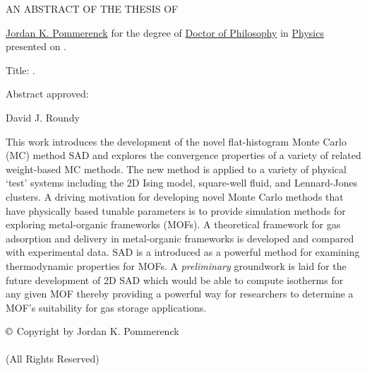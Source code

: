 \thispagestyle{empty}
\begin{center}
	\large
	AN ABSTRACT OF THE THESIS OF
\end{center}


\justify{}
\underline{Jordan K. Pommerenck} for the degree of \underline{Doctor of Philosophy} in \underline{Physics}
presented on \underline{}.
\vspace{1.0cm}

\justify{}
Title: \underline{}.
\vspace{2.0cm}

\justify{}
Abstract approved:
\underline{\hspace{11cm}}
\vspace{0.5cm}

\hspace{7.0cm} David J. Roundy
\vspace{1.0cm}

\justify{}
\doublespacing
This work introduces the development of the novel flat-histogram Monte 
Carlo (MC) method SAD and explores the convergence properties of a 
variety of related weight-based MC methods. The new method is applied 
to a variety of physical `test' systems including the 2D Ising model, 
square-well fluid, and Lennard-Jones clusters. A driving motivation for 
developing novel Monte Carlo methods that have physically based tunable 
parameters is to provide simulation methods for exploring metal-organic 
frameworks (MOFs). A theoretical framework for gas adsorption and 
delivery in metal-organic frameworks is developed and compared with 
experimental data. SAD is a introduced as a powerful method for 
examining thermodynamic properties for MOFs.  A \emph{preliminary} 
groundwork is laid for the future development of 2D SAD which would be 
able to compute isotherms for any given MOF thereby providing a 
powerful way for researchers to determine a MOF's suitability for gas 
storage applications.


\newpage{}
\thispagestyle{empty}
\singlespacing

\vspace*{4.0cm}
\begin{center}
$\copyright$ Copyright by Jordan K. Pommerenck \\
 \\
(All Rights Reserved)
\end{center}

